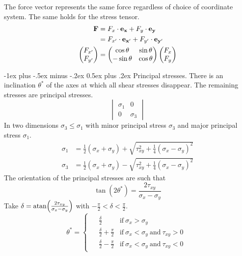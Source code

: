 \documentclass[10pt,landscape,a4paper]{article}
\makeatletter
\renewcommand{\section}{\@startsection{section}{1}{0mm}%
	{-1ex plus -.5ex minus -.2ex}%
	{0.5ex plus .2ex}%
	{\normalfont\large\bfseries}}
\makeatother
\begin{document}
\begin{multicols}{3}
\begin{figure}[H]
			\end{figure}
		The force vector represents the same force regardless of choice of coordinate system. The same holds for the stress tensor.
			\begin{align*}
				\vb{F}&=F_x\cdot\vb{e}_{\vb{x}}+F_y\cdot\vb{e}_{\vb{y}}\\
				&=F_{x'}\cdot\vb{e}_{\vb{x'}}+F_{y'}\cdot\vb{e}_{\vb{y'}}\\
				\begin{pmatrix}F_{x'}\\F_{y'}\end{pmatrix}&=\begin{pmatrix}\cos\theta&\sin\theta \\ -\sin\theta&\cos\theta\end{pmatrix}\begin{pmatrix}F_x\\F_y\end{pmatrix}
			\end{align*}
		
		\section{Principal stresses.}
		There is an inclination $ \theta^\ast $ of the axes at which all shear stresses disappear.
		The remaining stresses are principal stresses.
		\[
			\begin{vmatrix}
				\sigma_1&0\\
				0&\sigma_3
			\end{vmatrix}
		\]
		In two dimensions $ \sigma_3\leq\sigma_1 $ with minor principal stress $ \sigma_3 $ and major principal stress $ \sigma_1 $.
			\begin{align*}
				\sigma_1&=\frac{1}{2}(\sigma_x+\sigma_y)+\sqrt{\tau_{xy}^2+\frac{1}{4}(\sigma_x-\sigma_y)^2}\\
				\sigma_3&=\frac{1}{2}(\sigma_x+\sigma_y)-\sqrt{\tau_{xy}^2+\frac{1}{4}(\sigma_x-\sigma_y)^2}
			\end{align*}
		The orientation of the principal stresses are such that
		\[
			\tan(2\theta^\ast)=\frac{2\tau_{xy}}{\sigma_x-\sigma_y}
		\]
		Take $ \delta=\atan(\frac{2\tau_{xy}}{\sigma_x-\sigma_y}) $ with $ -\frac{\pi}{2}<\delta<\frac{\pi}{2} $.
		\[\theta^\ast=
			\begin{cases*}
				\begin{aligned}
					&\frac{\delta}{2}& \text{if} \ \sigma_x>\sigma_y\\
					&\frac{\delta}{2}+\frac{\pi}{2}& \text{if} \ \sigma_x<\sigma_y \ \text{and} \ \tau_{xy}>0\\
					&\frac{\delta}{2}-\frac{\pi}{2}& \text{if} \ \sigma_x<\sigma_y \ \text{and} \ \tau_{xy}<0
				\end{aligned}
			\end{cases*}
		\]
		

\end{multicols}
\end{document}

